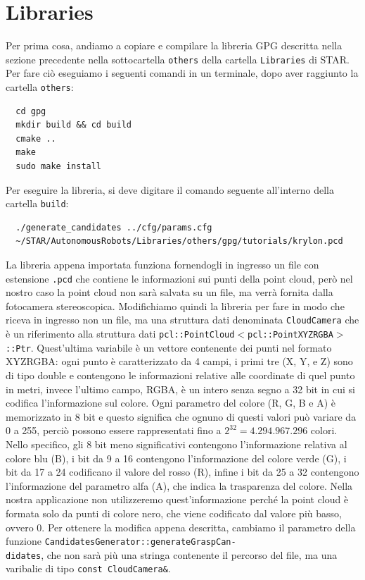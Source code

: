 \documentclass{report}
\begin{document}
\section{Libraries}
Per prima cosa, andiamo a copiare e compilare la libreria GPG descritta nella sezione precedente nella sottocartella \texttt{others} della cartella \texttt{Libraries} di STAR. Per fare ciò eseguiamo i seguenti comandi in un terminale, dopo aver raggiunto la cartella \texttt{others}:
\begin{verbatim}
  cd gpg
  mkdir build && cd build
  cmake ..
  make
  sudo make install
\end{verbatim}
Per eseguire la libreria, si deve digitare il comando seguente all'interno della cartella \texttt{build}:
\begin{verbatim}
  ./generate_candidates ../cfg/params.cfg 
  ~/STAR/AutonomousRobots/Libraries/others/gpg/tutorials/krylon.pcd
\end{verbatim}
La libreria appena importata funziona fornendogli in ingresso un file con estensione \texttt{.pcd} che contiene le informazioni sui punti della point cloud, però nel nostro caso la point cloud non sarà salvata su un file, ma verrà fornita dalla fotocamera stereoscopica. Modifichiamo quindi la libreria per fare in modo che riceva in ingresso non un file, ma una struttura dati denominata \texttt{CloudCamera} che è un riferimento alla struttura dati \texttt{pcl::PointCloud$<$pcl::PointXYZRGBA$>$::Ptr}. Quest'ultima variabile è un vettore contenente dei punti nel formato XYZRGBA: ogni punto è caratterizzato da 4 campi, i primi tre (X, Y, e Z) sono di tipo double e contengono le informazioni relative alle coordinate di quel punto in metri, invece l'ultimo campo, RGBA, è un intero senza segno a 32 bit in cui si codifica l'informazione sul colore. Ogni parametro del colore (R, G, B e A) è memorizzato in 8 bit e questo significa che ognuno di questi valori può variare da 0 a 255, perciò possono essere rappresentati fino a $\displaystyle{2^{32}=4.294.967.296}$ colori. Nello specifico, gli 8 bit meno significativi contengono l'informazione relativa al colore blu (B), i bit da 9 a 16 contengono l'informazione del colore verde (G), i bit da 17 a 24 codificano il valore del rosso (R), infine i bit da 25 a 32 contengono l'informazione del parametro alfa (A), che indica la trasparenza del colore. Nella nostra applicazione non utilizzeremo quest'informazione perché la point cloud è formata solo da punti di colore nero, che viene codificato dal valore più basso, ovvero 0. Per ottenere la modifica appena descritta, cambiamo il parametro della funzione \texttt{CandidatesGenerator::generateGraspCan-}\\\texttt{didates}, che non sarà più una stringa contenente il percorso del file, ma una varibalie di tipo \texttt{const CloudCamera\&}. \par
\end{document}

